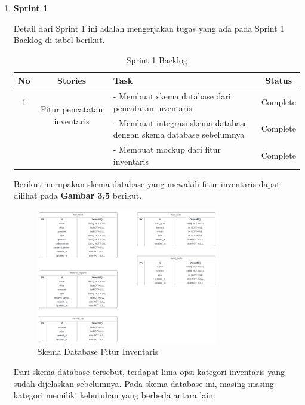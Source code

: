\begin{enumerate}
	\begin{enumerate}
		\item \textbf{Sprint 1}
		
		Detail dari Sprint 1 ini adalah mengerjakan tugas yang ada pada Sprint 1 Backlog di tabel berikut.

		\begin{table}[H]	
			\begin{center}
				\caption{Sprint 1 Backlog}
				\label{tab:table6}
				\begin{tabular}{|c|c|m{13em}|c|}
				\hline
				\textbf{No} & \textbf{Stories} & \textbf{Task} & \textbf{Status} \\
				\hline
				1 & \multirow{2}{10em}{Fitur pencatatan inventaris} & - Membuat skema database dari pencatatan inventaris & Complete \\
				&  & - Membuat integrasi skema database dengan skema database sebelumnya & Complete \\
				&  & - Membuat mockup dari fitur inventaris & Complete \\
				\hline
				\end{tabular}
			\end{center}
		\end{table}

		Berikut merupakan skema database yang mewakili fitur inventaris dapat dilihat pada \textbf{Gambar 3.5} berikut.
		
		\begin{figure}[H]
			\centering
			\includegraphics[width=0.75\textwidth]{gambar/sprint1/sprint1_inventaris_database.jpeg}
			\caption{Skema Database Fitur Inventaris}
		\end{figure}
	
		Dari skema database tersebut, terdapat lima opsi kategori inventaris yang sudah dijelaskan sebelumnya. Pada skema database ini, masing-masing kategori memiliki kebutuhan yang berbeda antara lain.
	

\end{enumerate}
\end{enumerate}
